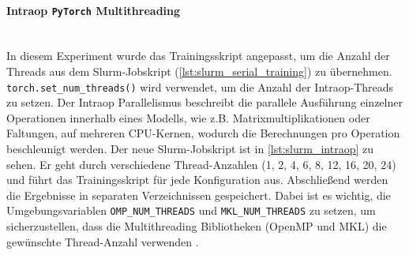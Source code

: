 \documentclass{article}
\begin{document}
\paragraph{Intraop \texttt{PyTorch} Multithreading} \mbox{}\\
In diesem Experiment wurde das Trainingsskript angepasst, um die Anzahl der Threads aus dem Slurm-Jobskript (\ref{lst:slurm_serial_training}) zu übernehmen. 
\texttt{torch.set\_num\_threads()} wird verwendet, um die Anzahl der Intraop-Threads zu setzen. 
Der Intraop Parallelismus beschreibt die parallele Ausführung einzelner Operationen innerhalb eines Modells, 
wie z.B. Matrixmultiplikationen oder Faltungen, auf mehreren CPU-Kernen, wodurch die Berechnungen pro Operation beschleunigt werden. 
Der neue Slurm-Jobskript ist in \ref{lst:slurm_intraop} zu sehen. Er geht durch verschiedene Thread-Anzahlen (1, 2, 4, 6, 8, 12, 16, 20, 24) 
und führt das Trainingsskript für jede Konfiguration aus. Abschließend werden die Ergebnisse in separaten Verzeichnissen gespeichert. Dabei ist es wichtig,
die Umgebungsvariablen \texttt{OMP\_NUM\_THREADS} und \texttt{MKL\_NUM\_THREADS} zu setzen, um sicherzustellen,
dass die Multithreading Bibliotheken (OpenMP und MKL) die gewünschte Thread-Anzahl verwenden \parencite{pytorch2025threading}.
\end{document}
